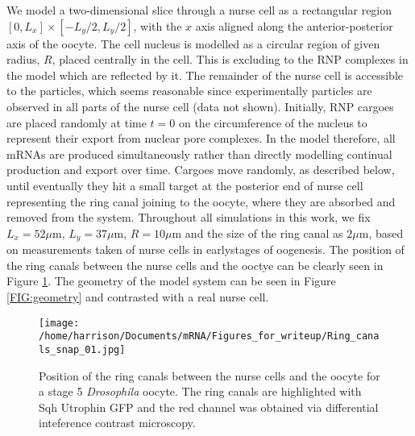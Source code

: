 \documentclass[twocolumn]{biophys}
\begin{document}
We model a two-dimensional slice through a nurse cell as a rectangular region $[0,L_x] \times [-L_y/2, L_y/2]$, with the $x$ axis aligned along the anterior-posterior axis of the oocyte.
The cell nucleus is modelled as a circular region of given radius, $R$, placed centrally in the cell. 
This is excluding to the RNP complexes in the model which are reflected by it.
The remainder of the nurse cell is accessible to the particles, which seems reasonable since experimentally particles are observed in all parts of the nurse cell (data not shown).
Initially, RNP cargoes are placed randomly at time $t=0$ on the circumference of the nucleus to represent their export from nuclear pore complexes.
In the model therefore, all mRNAs are produced simultaneously rather than directly modelling continual production and export over time.
Cargoes move randomly, as described below, until eventually they hit a small target at the posterior end of nurse cell representing the ring canal joining to the oocyte, where they are absorbed and removed from the system.
Throughout all simulations in this work, we fix $L_x=52 \mu \text{m}$, $L_y=37 \mu \text{m}$, $R=10 \mu \text{m}$ and the size of the ring canal as $2\mu \text{m}$, based on measurements taken of nurse cells in earlystages of oogenesis.
The position of the ring canals between the nurse cells and the ooctye can be clearly seen in Figure \ref{FIG:ring_canals}.
The geometry of the model system can be seen in Figure \ref{FIG:geometry} and contrasted with a real nurse cell.
\begin{figure}[h]
 \centering
 \texttt{[image: /home/harrison/Documents/mRNA/Figures\_for\_writeup/Ring\_canals\_snap\_01.jpg]}
 \caption{Position of the ring canals between the nurse cells and the oocyte for a stage 5 \textit{Drosophila} oocyte. The ring canals are highlighted with Sqh Utrophin GFP and the red channel was obtained via differential inteference contrast microscopy.}
 \label{FIG:ring_canals}
\end{figure}
\end{document}
